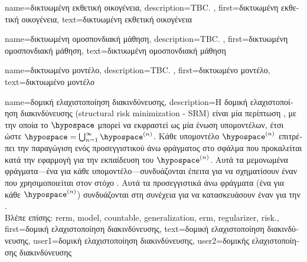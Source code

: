 {name={\foreignlanguage{greek}{δικτυωμένη εκθετική οικογένεια}}, 
	description={TBC. },
	  first={\foreignlanguage{greek}{δικτυωμένη εκθετική οικογένεια}},
	  text={\foreignlanguage{greek}{δικτυωμένη εκθετική οικογένεια}}  
}%

{name={\foreignlanguage{greek}{δικτυωμένη ομοσπονδιακή μάθηση}},
	description={TBC. },
 	first={\foreignlanguage{greek}{δικτυωμένη ομοσπονδιακή μάθηση}},
	text={\foreignlanguage{greek}{δικτυωμένη ομοσπονδιακή μάθηση}} 
}%

{name={\foreignlanguage{greek}{δικτυωμένο μοντέλο}},
	description={TBC. }, 
   	first={\foreignlanguage{greek}{δικτυωμένο μοντέλο}},
   	text={\foreignlanguage{greek}{δικτυωμένο μοντέλο}}  
}%

{name={\foreignlanguage{greek}{δομική ελαχιστοποίηση διακινδύνευσης}}, 
	description={\foreignlanguage{greek}{Η δομική ελαχιστοποί\-ηση  
		διακινδύνευσης} 
		(structural risk minimization - SRM) \foreignlanguage{greek}{είναι μία περίπτωση} , \foreignlanguage{greek}{με την 
		οποία το}  $\hypospace$ \foreignlanguage{greek}{μπορεί να εκφραστεί ως μία}  
		\foreignlanguage{greek}{ένωση υπομοντέλων, έτσι ώστε $\hypospace = \bigcup_{n=1}^{\infty} \hypospace^{(n)}$. 
		Κάθε υπομοντέλο $\hypospace^{(n)}$ επιτρέπει την παραγώγιση ενός προσεγγιστικού άνω φράγματος στο σφάλμα}  
		 \foreignlanguage{greek}{που προκαλείται κατά την εφαρμογή}  
		\foreignlanguage{greek}{για την εκπαίδευση του $\hypospace^{(n)}$. Αυτά τα μεμονωμένα φράγματα—ένα για κάθε 
		υπομοντέλο—συνδυάζονται έπειτα για να σχηματίσουν έναν}  
		\foreignlanguage{greek}{που χρησιμοποιείται στον στόχο} . \foreignlanguage{greek}{Αυτά τα προσεγγιστικά άνω 
		φράγματα (ένα για κάθε $\hypospace^{(n)}$) συνδυάζονται στη συνέχεια για να κατασκευάσουν έναν}  
		\foreignlanguage{greek}{για την}  \cite[\foreignlanguage{greek}{Ενότητα}\ 7.2]{ShalevMLBook}.
		\\
		\foreignlanguage{greek}{Βλέπε επίσης:} \gls{rerm}, \gls{model}, \gls{countable}, \gls{generalization}, \gls{erm}, \gls{regularizer}, \gls{risk}.},
	first={\foreignlanguage{greek}{δομική ελαχιστοποίηση διακινδύνευσης}},
	text={\foreignlanguage{greek}{δομική ελαχιστοποίηση διακινδύνευσης}},
	user1={\foreignlanguage{greek}{δομική ελαχιστοποίηση διακινδύνευσης}}, %
  	user2={\foreignlanguage{greek}{δομικής ελαχιστοποίησης διακινδύνευσης}} %
}


